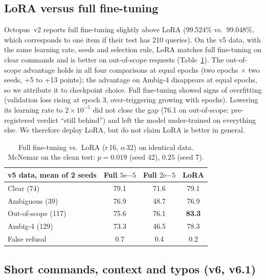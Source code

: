 \subsection{LoRA versus full fine-tuning}
\label{sec:lora}

Octopus~v2 reports full fine-tuning slightly above LoRA (99.524\% vs.\ 99.048\%, which corresponds to one item if their test
has 210 queries). On the v5 data, with the same learning rate, seeds and selection rule, LoRA matches full fine-tuning on
clear commands and is better on out-of-scope requests (Table~\ref{tab:lora}). The out-of-scope advantage holds in all four
comparisons at equal epochs (two epochs $\times$ two seeds, +5 to +13 points); the advantage on Ambig-4 disappears at equal
epochs, so we attribute it to checkpoint choice. Full fine-tuning showed signs of overfitting (validation loss rising at
epoch 3, over-triggering growing with epochs). Lowering its learning rate to $2\times10^{-5}$ did not close the gap (76.1 on
out-of-scope; pre-registered verdict ``still behind'') and left the model under-trained on everything else. We therefore
deploy LoRA, but do not claim LoRA is better in general.

\begin{table}[t]
\centering\small
\setlength{\tabcolsep}{4pt}
\begin{tabular}{@{}lccc@{}}
\toprule
v5 data, mean of 2 seeds & Full $5\mathrm{e}{-5}$ & Full $2\mathrm{e}{-5}$ & LoRA \\
\midrule
Clear (74) & 79.1 & 71.6 & 79.1 \\
Ambiguous (39) & 76.9 & 48.7 & 76.9 \\
Out-of-scope (117) & 75.6 & 76.1 & \textbf{83.3} \\
Ambig-4 (129) & 73.3 & 46.5 & 78.3 \\
False refusal & 0.7 & 0.4 & 0.2 \\
\bottomrule
\end{tabular}
\caption{Full fine-tuning vs.\ LoRA (r\,16, $\alpha$\,32) on identical data. McNemar on the clean test: $p=0.019$ (seed 42),
$0.25$ (seed 7).}
\label{tab:lora}
\end{table}

\subsection{Short commands, context and typos (v6, v6.1)}
\label{sec:v6}

